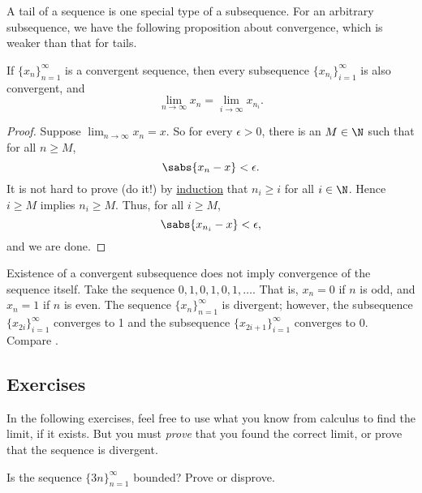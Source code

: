 A tail of a sequence is one special type of a subsequence.  For an arbitrary
subsequence, we have the following proposition about convergence,
which is weaker than that for tails.

\begin{prop} \label{prop:seqtosubseq}
If $\{ x_n \}_{n=1}^\infty$ is a convergent sequence,
then every subsequence $\{ x_{n_i} \}_{i=1}^\infty$ is also convergent, and
\begin{equation*}
\lim_{n\to \infty} x_n = 
\lim_{i\to \infty} x_{n_i} .
\end{equation*}
\end{prop}

\begin{proof}
Suppose $\lim_{n\to \infty} x_n = x$.  So for every
$\epsilon > 0$, there is an $M \in \N$ such that for all $n \geq M$,
\begin{equation*}
\sabs{x_n - x} < \epsilon .
\end{equation*}
It is not hard to prove (do it!) by \hyperref[induction:thm]{induction} that
$n_i \geq i$ for all $i \in \N$.  Hence $i \geq M$ implies $n_i \geq M$.  Thus,
for all $i \geq M$,
\begin{equation*}
\sabs{x_{n_i} - x} < \epsilon ,
\end{equation*}
and we are done.
\end{proof}

\begin{example}
Existence of a convergent subsequence does not imply
convergence of the sequence itself.
Take the sequence $0,1,0,1,0,1,\ldots$.  That is,
$x_n = 0$ if $n$ is odd, and $x_n = 1$ if $n$ is even.  The sequence
$\{ x_n \}_{n=1}^\infty$ is divergent; however, the subsequence
$\{ x_{2i} \}_{i=1}^\infty$ converges to 1 and the subsequence
$\{ x_{2i+1} \}_{i=1}^\infty$ converges to 0.  Compare .
\end{example}

\subsection{Exercises}

\begin{exnote}
In the following exercises, feel free to use what you know from calculus to
find the limit, if it exists.  But you must \emph{prove}
that you
found the correct limit, or prove that the sequence is divergent.
\end{exnote}

\begin{exercise}
Is the sequence
$\{ 3n \}_{n=1}^\infty$
bounded?  Prove or disprove.
\end{exercise}

